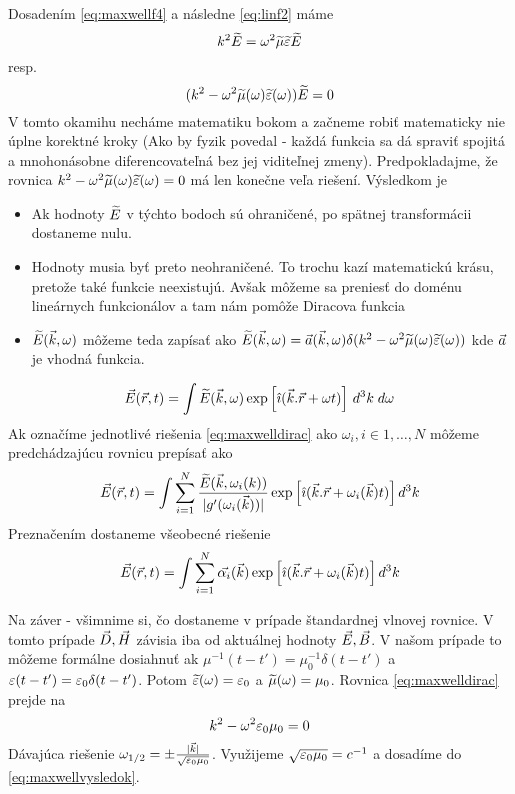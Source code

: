 Dosadením \ref{eq:maxwellf4} a následne \ref{eq:linf2} máme
\begin{equation*}
  k^2 \widetilde{E} = \omega^2 \widetilde{\mu}\widetilde{\varepsilon} \widetilde{E}    
\end{equation*}
resp.
\begin{equation}
    \label{eq:maxwelldirac}
  (k^2 - \omega^2 \widetilde{\mu}(\omega)\widetilde{\varepsilon}(\omega)) \widetilde{E} =0
\end{equation}
V tomto okamihu necháme matematiku bokom a začneme robiť matematicky
nie úplne korektné kroky (Ako by fyzik povedal - každá funkcia sa dá
spraviť spojitá a mnohonásobne diferencovateľná bez jej viditeľnej
zmeny). Predpokladajme, že rovnica 
  $k^2 - \omega^2 \widetilde{\mu}(\omega)\widetilde{\varepsilon}(\omega)=0$ má len
  konečne veľa riešení. Výsledkom je 
\begin{itemize}
\item Ak hodnoty $\widetilde{E}$ v týchto bodoch sú ohraničené, po spätnej
    transformácii dostaneme nulu.
\item Hodnoty musia byť preto neohraničené. To trochu kazí matematickú
krásu, pretože také funkcie neexistujú. Avšak môžeme sa preniesť do
doménu lineárnych funkcionálov a tam nám pomôže Diracova funkcia
\item $\widetilde{E}{(\vec{k},\omega)}$ môžeme teda zapísať ako $\widetilde{E}{(\vec{k},\omega)} = \vec{a}{(\vec{k},\omega)}
\delta( k^2 - \omega^2 \widetilde{\mu}(\omega)\widetilde{\varepsilon}(\omega))$ kde
$\vec{a}$ je vhodná funkcia.
\end{itemize}

\begin{equation}
    \vec{E}{(\vec{r},t)} = \int \widetilde{E}{(\vec{k},\omega)} \exp\left[\hat{\imath} (\vec{k}.\vec{r} +
    \omega t)\right]\,d^3k\;d\omega
\end{equation}
Ak označíme jednotlivé riešenia \ref{eq:maxwelldirac} ako $\omega_i, i
\in 1,\dots,N$ môžeme predchádzajúcu rovnicu prepísať ako
\begin{equation}
    \vec{E}{(\vec{r},t)} = \int \sum_{i=1}^N
    \frac{\widetilde{E}(\vec{k},\omega_i(k))}{|g'(\omega_i(\vec{k}))|}
    \exp\left[\hat{\imath} (\vec{k} . \vec{r} + \omega_i(\vec{k})
    t)\right] d^3k
\end{equation}
Preznačením dostaneme všeobecné riešenie
\begin{equation}
    \label{eq:maxwellvysledok}
    \vec{E}{(\vec{r},t)} = \int \sum_{i=1}^N \vec{\alpha_i}(\vec{k})
    \exp\left[\hat{\imath} (\vec{k}.\vec{r} + \omega_i(\vec{k})
    t)\right] d^3 k
\end{equation}

Na záver - všimnime si, čo dostaneme v prípade štandardnej vlnovej
rovnice. V tomto prípade $\vec{D},\vec{H}$ závisia iba od
aktuálnej hodnoty $\vec{E},\vec{B}$. V našom prípade to môžeme
formálne dosiahnuť ak $\mu^{-1}(t-t')=\mu_0^{-1} \delta(t-t')$ a
$\varepsilon(t-t')=\varepsilon_0 \delta(t-t')$.
Potom $\widetilde{\varepsilon}(\omega) = \varepsilon_0$ a $\widetilde{\mu}(\omega)=\mu_0$.
Rovnica \ref{eq:maxwelldirac} prejde na
\begin{equation}
    k^2 - \omega^2 \varepsilon_0 \mu_0 = 0
\end{equation}
Dávajúca riešenie $\omega_{1/2}=\pm \frac{|\vec{k}|}{\sqrt{\varepsilon_0
\mu_0}}$. Využijeme $\sqrt{\varepsilon_0 \mu_0}=c^{-1}$ a dosadíme do
\ref{eq:maxwellvysledok}.

